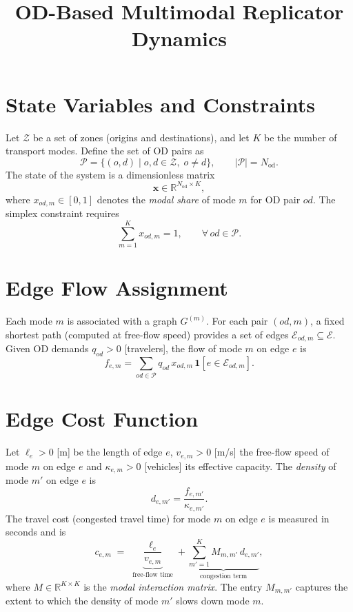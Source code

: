 \documentclass[11pt,a4paper]{article}
\title{\textbf{OD-Based Multimodal Replicator Dynamics}\\[4pt]}
\author{}
\date{}
\begin{document}
\maketitle
\thispagestyle{empty}

\section{State Variables and Constraints}

Let $\mathcal{Z}$ be a set of zones (origins and destinations), and let $K$ be the number of transport modes. Define the set of OD pairs as
\[
  \mathcal{P} = \{(o,d) \mid o,d\in\mathcal{Z},\; o\neq d\},
  \qquad |\mathcal{P}| = N_{\mathrm{od}}.
\]
The state of the system is a dimensionless matrix
\[
  \mathbf{x} \in \mathbb{R}^{N_{\mathrm{od}} \times K},
\]
where $x_{od,m} \in [0,1]$ denotes the \emph{modal share} of mode $m$ for OD pair $od$. The simplex constraint requires
\[
  \sum_{m=1}^{K} x_{od,m} = 1, \qquad \forall\, od \in \mathcal{P}.
\]

\section{Edge Flow Assignment}

Each mode $m$ is associated with a graph $G^{(m)}$. For each pair $(od, m)$, a fixed shortest path (computed at free-flow speed) provides a set of edges $\mathcal{E}_{od,m} \subseteq \mathcal{E}$. Given OD demands $q_{od} > 0$ [travelers], the flow of mode $m$ on edge $e$ is
\[
  f_{e,m} = \sum_{od \in \mathcal{P}} q_{od}\, x_{od,m}\, \mathbf{1}\!\left[e \in \mathcal{E}_{od,m}\right].
\]

\section{Edge Cost Function}

Let $\ell_e > 0$ [m] be the length of edge $e$, $v_{e,m} > 0$ [m/s] the free-flow speed of mode $m$ on edge $e$ and $\kappa_{e,m} > 0$ [vehicles] its effective capacity. The \emph{density} of mode $m'$ on edge $e$ is
\[
  d_{e,m'} = \frac{f_{e,m'}}{\kappa_{e,m'}}.
\]
The travel cost (congested travel time) for mode $m$ on edge $e$ is measured in seconds and is
\[
  \boxed{
  c_{e,m} \;=\; \underbrace{\dfrac{\ell_e}{v_{e,m}}}_{\text{free-flow time}}
            + \underbrace{\sum_{m'=1}^{K} M_{m,m'}\,d_{e,m'}}_{\text{congestion term}},
  }
\]
where $M \in \mathbb{R}^{K \times K}$ is the \emph{modal interaction matrix}. The entry $M_{m,m'}$ captures the extent to which the density of mode $m'$ slows down mode $m$.
\end{document}
